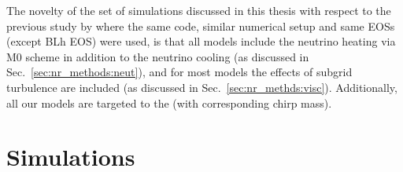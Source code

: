 


%


The novelty of the set of simulations discussed in this thesis with 
respect to the previous study by \citet{Radice:2018pdn} where the same code,
similar numerical setup and same \acp{EOS} (except BLh \ac{EOS}) were used, 
is that all models include the neutrino heating via 
M0 scheme in addition to the neutrino cooling 
(as discussed in Sec.~\ref{sec:nr_methods:neut}), 
and for most models the effects of subgrid turbulence  
are included (as discussed in Sec.~\ref{sec:nr_methds:visc}). 
Additionally, all our models are targeted to the \GW{} 
(with corresponding chirp mass).



\section{Simulations}\label{sec:bns_merg:sims}




